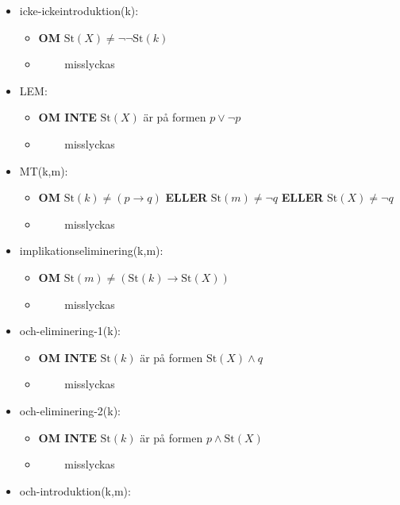 \documentclass[a4paper,10.5pt]{article}
\newcommand{\St}[1]{\mathrm{St}(#1)}
\begin{document}
\begin{itemize}
\begin{itemize}
\begin{itemize}
\begin{itemize}
            \end{itemize}
        \item[] icke-ickeintroduktion(k):
            \begin{itemize}
            \item[] \textbf{OM} $\St{X} \neq \lnot \lnot \St{k}$
            \item[] $\qquad$ misslyckas
            \end{itemize}
        \item[] LEM:
            \begin{itemize}
            \item[] \textbf{OM INTE} $\St{X}$ är på formen $p \lor \lnot p$
            \item[] $\qquad$ misslyckas
            \end{itemize}
        \item[] MT(k,m):
            \begin{itemize}
            \item[] \textbf{OM} $\St{k} \neq (p \rightarrow q)$ \textbf{ELLER} $\St{m} \neq \lnot q$ \textbf{ELLER} $\St{X} \neq \lnot q$
            \item[] $\qquad$ misslyckas
            \end{itemize}
        \item[] implikationseliminering(k,m):
            \begin{itemize}
            \item[] \textbf{OM} $\St{m} \neq (\St{k} \rightarrow \St{X})$
            \item[] $\qquad$ misslyckas
            \end{itemize}
        \item[] och-eliminering-1(k):
            \begin{itemize}
            \item[] \textbf{OM INTE} $\St{k}$ är på formen $\St{X} \land q$
            \item[] $\qquad$ misslyckas
            \end{itemize}
        \item[] och-eliminering-2(k):
            \begin{itemize}
            \item[] \textbf{OM INTE} $\St{k}$ är på formen $p \land \St{X}$
            \item[] $\qquad$ misslyckas
            \end{itemize}
        \item[] och-introduktion(k,m):

\end{itemize}
\end{itemize}
\end{itemize}
\end{document}
